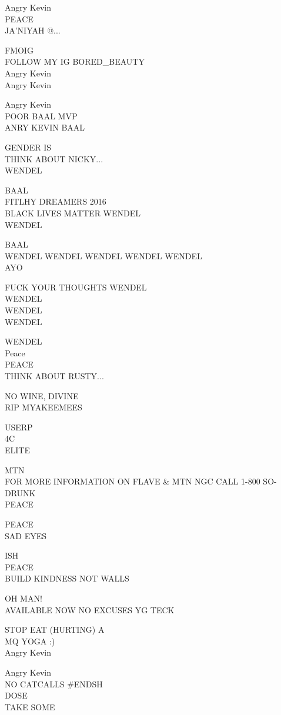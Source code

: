 \documentclass[10pt,letterpaper]{article}
\begin{document}
Angry Kevin\\
PEACE\\
JA'NIYAH @...

FMOIG\\
FOLLOW MY IG BORED\_BEAUTY\\
Angry Kevin\\
Angry Kevin

Angry Kevin\\
POOR BAAL MVP\\
ANRY KEVIN BAAL

GENDER IS\\
THINK ABOUT NICKY...\\
WENDEL

BAAL\\
FITLHY DREAMERS 2016\\
BLACK LIVES MATTER WENDEL\\
WENDEL

BAAL\\
WENDEL WENDEL WENDEL WENDEL WENDEL\\
AYO

FUCK YOUR THOUGHTS WENDEL\\
WENDEL\\
WENDEL\\
WENDEL

WENDEL\\
Peace\\
PEACE\\
THINK ABOUT RUSTY...

NO WINE, DIVINE\\
RIP MYAKEEMEES

USERP\\
4C\\
ELITE

MTN\\
FOR MORE INFORMATION ON FLAVE \& MTN NGC CALL 1{-}800 SO{-}DRUNK\\
PEACE

PEACE\\
SAD EYES

ISH\\
PEACE\\
BUILD KINDNESS NOT WALLS

OH MAN!\\
AVAILABLE NOW NO EXCUSES YG TECK

STOP EAT (HURTING) A\\
MQ YOGA :)\\
Angry Kevin

Angry Kevin\\
NO CATCALLS \#ENDSH\\
DOSE\\
TAKE SOME
\end{document}

